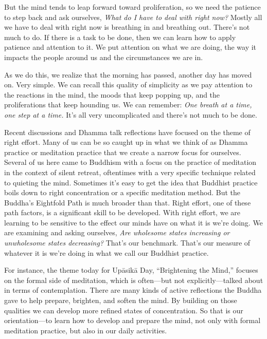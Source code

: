 But the mind tends to leap forward toward proliferation, so we need the 
patience to step back and ask ourselves, \emph{What do I have to deal 
with right now?} Mostly all we have to deal with right now is breathing 
in and breathing out. There's not much to do. If there is a task to be 
done, then we can learn how to apply patience and attention to it. We 
put attention on what we are doing, the way it impacts the people 
around us and the circumstances we are in.

As we do this, we realize that the morning has passed, another day has 
moved on. Very simple. We can recall this quality of simplicity as we 
pay attention to the reactions in the mind, the moods that keep popping 
up, and the proliferations that keep hounding us. We can remember: 
\emph{One breath at a time, one step at a time.} It's all very 
uncomplicated and there's not much to be done.


Recent discussions and Dhamma talk reflections have focused on the 
theme of right effort. Many of us can be so caught up in what we think 
of as Dhamma practice or meditation practice that we create a narrow 
focus for ourselves. Several of us here came to Buddhism with a focus 
on the practice of meditation in the context of silent retreat, 
oftentimes with a very specific technique related to quieting the mind. 
Sometimes it's easy to get the idea that Buddhist practice boils down 
to right concentration or a specific meditation method. But the 
Buddha's Eightfold Path is much broader than that. Right effort, one of 
these path factors, is a significant skill to be developed. With right 
effort, we are learning to be sensitive to the effect our minds have on 
what it is we're doing. We are examining and asking ourselves, 
\emph{Are wholesome states increasing or unwholesome states 
decreasing?} That's our benchmark. That's our measure of whatever it is 
we're doing in what we call our Buddhist practice.

For instance, the theme today for Upāsikā Day, ``Brightening the 
Mind,'' focuses on the formal side of meditation, which is often---but 
not explicitly---talked about in terms of contemplation. There are many 
kinds of active reflections the Buddha gave to help prepare, brighten, 
and soften the mind. By building on those qualities we can develop more 
refined states of concentration. So that is our orientation---to learn 
how to develop and prepare the mind, not only with formal meditation 
practice, but also in our daily activities.

